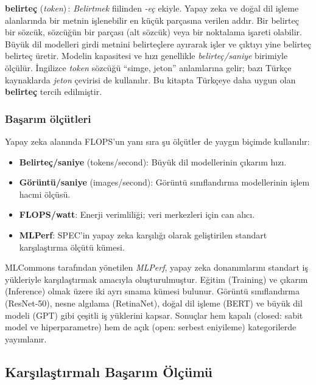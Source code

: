 \begin{terimnotu}
\textbf{belirteç} (\emph{token})\,: \emph{Belirtmek} fiilinden \emph{-eç} ekiyle. Yapay zeka ve doğal dil işleme alanlarında bir metnin işlenebilir en küçük parçasına verilen addır. Bir belirteç bir sözcük, sözcüğün bir parçası (alt sözcük) veya bir noktalama işareti olabilir. Büyük dil modelleri girdi metnini belirteçlere ayırarak işler ve çıktıyı yine belirteç belirteç üretir. Modelin kapasitesi ve hızı genellikle \emph{belirteç/saniye} birimiyle ölçülür. İngilizce \emph{token} sözcüğü ``simge, jeton'' anlamlarına gelir; bazı Türkçe kaynaklarda \emph{jeton} çevirisi de kullanılır. Bu kitapta Türkçeye daha uygun olan \textbf{belirteç} tercih edilmiştir.
\end{terimnotu}

\subsubsection*{Başarım ölçütleri}
Yapay zeka alanında FLOPS'un yanı sıra şu ölçütler de yaygın biçimde kullanılır:
\begin{itemize}
    \item \textbf{Belirteç/saniye} (tokens/second): Büyük dil modellerinin çıkarım hızı.
    \item \textbf{Görüntü/saniye} (images/second): Görüntü sınıflandırma modellerinin işlem hacmi ölçüsü.
    \item \textbf{FLOPS/watt}: Enerji verimliliği; veri merkezleri için can alıcı.
    \item \textbf{MLPerf}: SPEC'in yapay zeka karşılığı olarak geliştirilen standart karşılaştırma ölçütü kümesi.
\end{itemize}

\begin{bilginot}\label{bn:mlperf}
MLCommons tarafından yönetilen \emph{MLPerf}, yapay zeka donanımlarını standart iş yükleriyle karşılaştırmak amacıyla oluşturulmuştur. Eğitim (Training) ve çıkarım (Inference) olmak üzere iki ayrı sınama kümesi bulunur. Görüntü sınıflandırma (ResNet-50), nesne algılama (RetinaNet), doğal dil işleme (BERT) ve büyük dil modeli (GPT) gibi çeşitli iş yüklerini kapsar. Sonuçlar hem kapalı (closed: sabit model ve hiperparametre) hem de açık (open: serbest eniyileme) kategorilerde yayımlanır.
\end{bilginot}


\subsection{Karşılaştırmalı Başarım Ölçümü}
\label{subsec:karsilastirmali-basarim}

